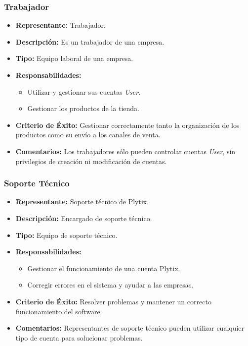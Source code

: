 \documentclass[12pt.a4paper]{article}
\begin{document}
\subsubsection{Trabajador}

\begin{itemize}
    \item \textbf{Representante:} Trabajador.
    \item \textbf{Descripción:} Es un trabajador de una empresa.
    \item \textbf{Tipo:} Equipo laboral de una empresa.
    \item \textbf{Responsabilidades:}
    \begin{itemize}
        \item Utilizar y gestionar sus cuentas \textit{User}.
        \item Gestionar los productos de la tienda.
    \end{itemize}
    \item \textbf{Criterio de Éxito:} Gestionar correctamente tanto la organización de los productos como su envío a los canales de venta.
    \item \textbf{Comentarios:} Los trabajadores sólo pueden controlar cuentas \textit{User}, sin privilegios de creación ni modificación de cuentas.
\end{itemize}

\subsubsection{Soporte Técnico}

\begin{itemize}
    \item \textbf{Representante:} Soporte técnico de Plytix.
    \item \textbf{Descripción:} Encargado de soporte técnico.
    \item \textbf{Tipo:} Equipo de soporte técnico.
    \item \textbf{Responsabilidades:}
    \begin{itemize}
        \item Gestionar el funcionamiento de una cuenta Plytix.
        \item Corregir errores en el sistema y ayudar a las empresas.
    \end{itemize}
    \item \textbf{Criterio de Éxito:} Resolver problemas y mantener un correcto funcionamiento del software.
    \item \textbf{Comentarios:} Representantes de soporte técnico pueden utilizar cualquier tipo de cuenta para solucionar problemas.
\end{itemize}
\end{document}

